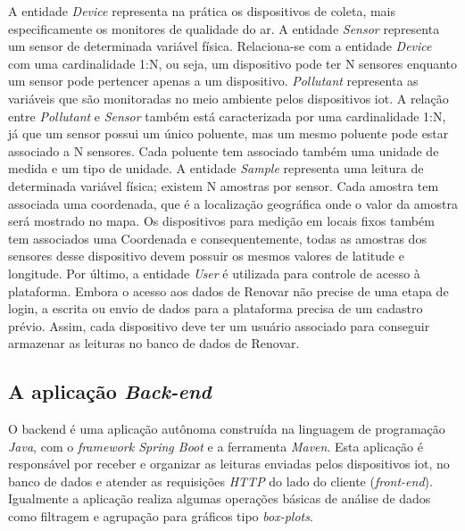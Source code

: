 A entidade \textit{Device} representa na prática os dispositivos de coleta, mais especificamente os monitores de qualidade do ar. A entidade \textit{Sensor} representa um sensor de determinada variável física. Relaciona-se com a entidade \textit{Device} com uma cardinalidade 1:N, ou seja, um dispositivo pode ter N sensores enquanto um sensor pode pertencer apenas a um dispositivo. \textit{Pollutant} representa as variáveis que são monitoradas no meio ambiente pelos dispositivos \acrshort{iot}. A relação entre \textit{Pollutant} e \textit{Sensor} também está caracterizada por uma cardinalidade 1:N, já que um sensor possui um único poluente, mas um mesmo poluente pode estar associado a N sensores. Cada poluente tem associado também uma unidade de medida e um tipo de unidade. A entidade \textit{Sample} representa uma leitura de determinada variável física; existem N amostras por sensor. Cada amostra tem associada uma coordenada, que é a localização geográfica onde o valor da amostra será mostrado no mapa. Os dispositivos para medição em locais fixos também tem associados uma Coordenada e consequentemente, todas as amostras dos sensores desse dispositivo devem possuir os mesmos valores de latitude e longitude. Por último, a entidade \textit{User} é utilizada para controle de acesso à plataforma. Embora o acesso aos dados de Renovar não precise de uma etapa de login, a escrita ou envio de dados para a plataforma precisa de um cadastro prévio. Assim, cada dispositivo deve ter um usuário associado para conseguir armazenar as leituras no banco de dados de Renovar.

\subsection{A aplicação \textit{Back-end}}

O backend é uma aplicação autônoma construída na linguagem de programação \textit{Java}, com o \textit{framework Spring Boot} e a ferramenta \textit{Maven}. Esta aplicação é responsável por receber e organizar as leituras enviadas pelos dispositivos \acrshort{iot}, no banco de dados e atender as requisições \textit{HTTP} do lado do cliente (\textit{front-end}). Igualmente a aplicação realiza algumas operações básicas de análise de dados como filtragem e agrupação para gráficos tipo \textit{box-plots}.

